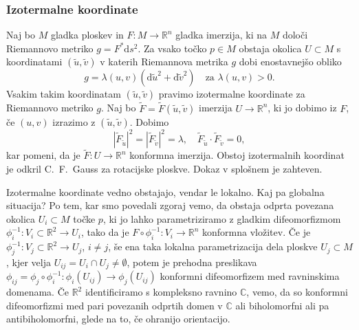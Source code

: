 \documentclass[8pt]{beamer}
\theoremstyle{definition}
\theoremstyle{remark}
\theoremstyle{plain}
\numberwithin{equation}{section}  %
\begin{document}
\begin{frame}
    \frametitle{Izotermalne koordinate}

    Naj bo $M$ gladka ploskev in $F: M \rightarrow \mathbb{R}^n$ gladka imerzija, ki na $M$ določi Riemannovo metriko $g = F^* \mathrm{d}s^2$. Za vsako točko $p \in M$ obstaja okolica $U \subset M$ s koordinatami $(\tilde{u}, \tilde{v})$ v katerih Riemannova metrika $g$ dobi enostavnejšo obliko 
    \begin{equation*}
        g=\lambda(u,v)\left(\mathrm{d} \tilde{u}^2+\mathrm{d} \tilde{v}^2\right) \quad \text{za } \lambda(u,v) > 0.
    \end{equation*}
    Vsakim takim koordinatam $(\tilde{u}, \tilde{v})$ pravimo \textcolor{red1}{izotermalne koordinate} za Riemannovo metriko $g$. Naj bo $\widetilde{F}=\widetilde{F}(\tilde{u}, \tilde{v})$ imerzija $U \rightarrow \mathbb{R}^n$, ki jo dobimo iz $F$, če $(u, v)$ izrazimo z $(\tilde{u}, \tilde{v})$. Dobimo 
    \begin{equation*}
        \left|\widetilde{F}_{\tilde{u}}\right|^2=\left|\widetilde{F}_{\tilde{v}}\right|^2=\lambda, \quad \widetilde{F}_{\tilde{u}} \cdot \widetilde{F}_{\tilde{v}}=0,
    \end{equation*}
    kar pomeni, da je $\widetilde{F}: U \rightarrow \mathbb{R}^n$ konformna imerzija. Obstoj izotermalnih koordinat je odkril C.~F.~Gauss za rotacijske ploskve. Dokaz v splošnem je zahteven. 

    \vspace{0.8em}

    Izotermalne koordinate vedno obstajajo, vendar le lokalno. Kaj pa \textcolor{red1}{globalna situacija}? Po tem, kar smo povedali zgoraj vemo, da obstaja odprta povezana okolica $U_i\subset M$ točke $p$, ki jo lahko parametriziramo z gladkim difeomorfizmom $\phi_i^{-1}: V_i\subset \mathbb{R}^2 \rightarrow U_i$, tako da je $F \circ \phi_i^{-1}: V_i \rightarrow \mathbb{R}^n$ konformna vložitev. Če je $\phi_j^{-1}:V_j\subset \mathbb{R}^2 \rightarrow U_j$, $i\neq j$, še ena taka lokalna parametrizacija dela ploskve $U_j\subset M$, kjer velja $U_{ij}=U_i\cap U_j \neq \emptyset$, potem je \textcolor{red1}{prehodna preslikava} $\phi_{ij}=\phi_j \circ \phi_i^{-1}: \phi_i\left(U_{i j}\right) \rightarrow \phi_j\left(U_{i j}\right)$ konformni difeomorfizem med ravninskima domenama. Če $\mathbb{R}^2$ identificiramo s kompleksno ravnino $\mathbb{C}$, vemo, da so konformni difeomorfizmi med pari povezanih odprtih domen v $\mathbb{C}$ ali biholomorfni ali pa antibiholomorfni, glede na to, če ohranijo orientacijo. 
    
\end{frame}
\end{document}
